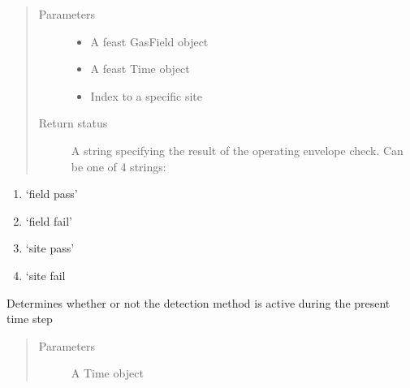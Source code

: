 \documentclass[letterpaper,10pt,english]{sphinxmanual}
\begin{document}
\begin{fulllineitems}
\begin{fulllineitems}
\begin{enumerate}
\end{enumerate}
\begin{quote}\begin{description}
\item[{Parameters}] \leavevmode\begin{itemize}
\item {} 
 \textendash{} A feast GasField object

\item {} 
 \textendash{} A feast Time object

\item {} 
 \textendash{} Index to a specific site

\end{itemize}

\item[{Return status}] \leavevmode
A string specifying the result of the operating envelope check. Can be one of 4 strings:

\end{description}\end{quote}
\begin{enumerate}
%
\item {} 
‘field pass’

\item {} 
‘field fail’

\item {} 
‘site pass’

\item {} 
‘site fail

\end{enumerate}

\end{fulllineitems}


\begin{fulllineitems}
\label{\detokenize{index:feast.DetectionModules.abstract_detection_method.DetectionMethod.check_time}}
Determines whether or not the detection method is active during the present time step
\begin{quote}\begin{description}
\item[{Parameters}] \leavevmode
{} \textendash{} A Time object


\end{description}
\end{quote}
\end{fulllineitems}
\end{fulllineitems}
\end{document}
